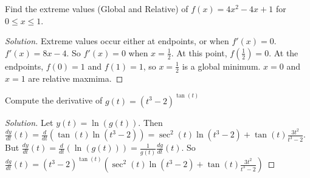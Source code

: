 \documentclass[crop=false,class=book]{standalone}
\begin{document}
\begin{problem}
Find the extreme values (Global and Relative) of $f(x)=4x^{2}-4x+1$ for $0\leq x\leq 1$.
\end{problem}
\begin{proof}[Solution]
Extreme values occur either at endpoints, or when $f'(x)=0$. $f'(x)=8x-4$. So $f'(x)=0$ when $x=\frac{1}{2}$. At this point, $f(\frac{1}{2})=0$. At the endpoints, $f(0)=1$ and $f(1)=1$, so $x=\frac{1}{2}$ is a global minimum. $x=0$ and $x=1$ are relative maxmima.
\end{proof}
\begin{problem}
Compute the derivative of $g(t)=(t^{3}-2)^{\tan(t)}$
\end{problem}
\begin{proof}[Solution]
Let $y(t)=\ln(g(t))$. Then $\frac{dy}{dt}(t)=\frac{d}{dt}(\tan(t)\ln(t^{3}-2))=\sec^{2}(t)\ln(t^{3}-2)+\tan(t)\frac{3t^{2}}{t^{3}-2}$. But $\frac{dy}{dt}(t)=\frac{d}{dt}(\ln(g(t)))=\frac{1}{g(t)}\frac{dg}{dt}(t)$. So $\frac{dg}{dt}(t)=(t^{3}-2)^{\tan(t)}(\sec^{2}(t)\ln(t^{3}-2)+\tan(t)\frac{3t^{2}}{t^{3}-2})$
\end{proof}
\end{document}
